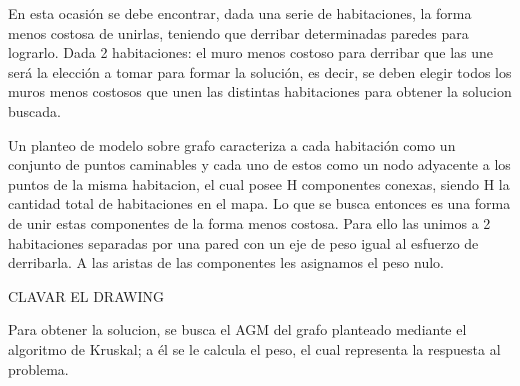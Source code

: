 En esta ocasión se debe encontrar, dada una serie de habitaciones, la forma menos costosa de unirlas, teniendo que derribar determinadas paredes para lograrlo. Dada 2 habitaciones: el muro menos costoso para derribar que las une será la elección a tomar para formar la solución, es decir, se deben elegir todos los muros menos costosos que unen las distintas habitaciones para obtener la solucion buscada.

Un planteo de modelo sobre grafo caracteriza a cada habitación como un conjunto de puntos caminables y cada uno de estos como un nodo adyacente a los puntos de la misma habitacion, el cual posee H componentes conexas, siendo H la cantidad total de habitaciones en el mapa. Lo que se busca entonces es una forma de unir estas componentes de la forma menos costosa. Para ello las unimos a 2 habitaciones separadas por una pared con un eje de peso igual al esfuerzo de derribarla. A las aristas de las componentes les asignamos el peso nulo.

CLAVAR EL DRAWING

Para obtener la solucion, se busca el AGM del grafo planteado mediante el algoritmo de Kruskal; a él se le calcula el peso, el cual representa la respuesta al problema.

